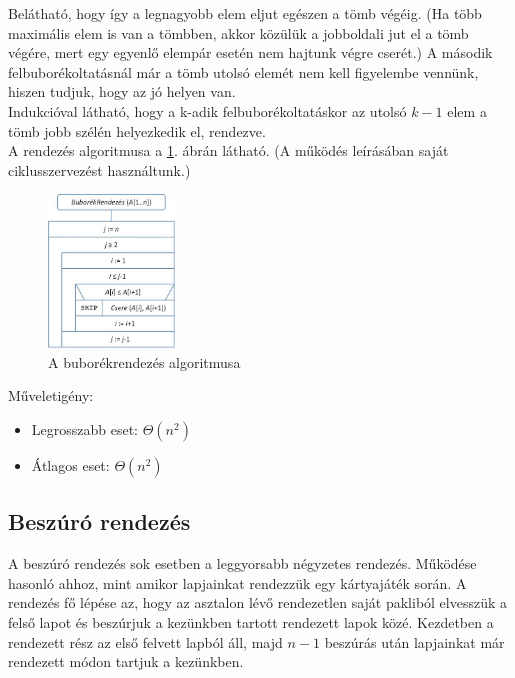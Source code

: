 \documentclass[12pt,margin=0px]{article}
\begin{document}
    Belátható, hogy így a legnagyobb elem eljut egészen a tömb végéig. (Ha több maximális elem is van a tömbben, akkor közülük a jobboldali jut el a tömb végére, mert egy egyenlő elempár esetén nem hajtunk végre cserét.) A második felbuborékoltatásnál már a tömb utolsó elemét nem kell figyelembe vennünk, hiszen tudjuk, hogy az jó helyen van.\\

    Indukcióval látható, hogy a k-adik felbuborékoltatáskor az utolsó $k-1$ elem a tömb jobb szélén helyezkedik el, rendezve.\\

    A rendezés algoritmusa a \ref{fig:bubblesort}. ábrán látható. (A működés leírásában saját ciklusszervezést használtunk.)

	\begin{figure}[H]
		\centering
		\includegraphics[width=0.3\textwidth]{img/bubblesort.png}
		\caption{A buborékrendezés algoritmusa}
        \label{fig:bubblesort}
	\end{figure}

    \noindent Műveletigény:
    \begin{itemize}
        \item Legrosszabb eset: $\Theta(n^2)$
        \item Átlagos eset: $\Theta(n^2)$
    \end{itemize}
	
	\subsection*{Beszúró rendezés}
	
    A beszúró rendezés sok esetben a leggyorsabb négyzetes rendezés. Működése hasonló ahhoz, mint amikor lapjainkat rendezzük egy kártyajáték során. A rendezés fő lépése az, hogy az asztalon lévő rendezetlen saját pakliból elvesszük a felső lapot és beszúrjuk a kezünkben tartott rendezett lapok közé. Kezdetben a rendezett rész az első felvett lapból áll, majd $n - 1$ beszúrás után lapjainkat már rendezett módon tartjuk a kezünkben.
\end{document}
